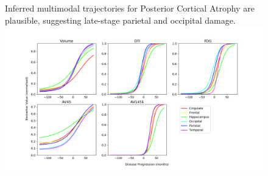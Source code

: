 \documentclass[portrait,a0,final,20pt]{a0poster}
\newcommand{\fnt}[1]{\LARGE{#1}}
\begin{document}
{\begin{multicols}{2}
\begin{figure}[H]
\fnt{Inferred multimodal trajectories for Posterior Cortical Atrophy are plausible, suggesting late-stage parietal and occipital damage. }\\
 \includegraphics[width=\columnwidth, trim=0 20 0 0, clip]{../figures/trajDisSpaceOverlap_PCA_tad-drcTinyPen5_JMD.png}
\end{figure}



\end{multicols}}
\end{document}
